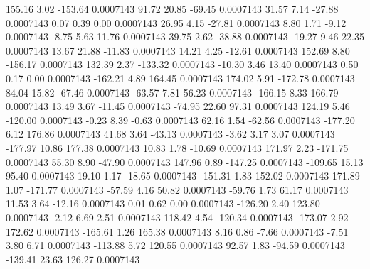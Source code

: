       155.16        3.02     -153.64     0.0007143
       91.72       20.85      -69.45     0.0007143
       31.57        7.14      -27.88     0.0007143
        0.07        0.39        0.00     0.0007143
       26.95        4.15      -27.81     0.0007143
        8.80        1.71       -9.12     0.0007143
       -8.75        5.63       11.76     0.0007143
       39.75        2.62      -38.88     0.0007143
      -19.27        9.46       22.35     0.0007143
       13.67       21.88      -11.83     0.0007143
       14.21        4.25      -12.61     0.0007143
      152.69        8.80     -156.17     0.0007143
      132.39        2.37     -133.32     0.0007143
      -10.30        3.46       13.40     0.0007143
        0.50        0.17        0.00     0.0007143
     -162.21        4.89      164.45     0.0007143
      174.02        5.91     -172.78     0.0007143
       84.04       15.82      -67.46     0.0007143
      -63.57        7.81       56.23     0.0007143
     -166.15        8.33      166.79     0.0007143
       13.49        3.67      -11.45     0.0007143
      -74.95       22.60       97.31     0.0007143
      124.19        5.46     -120.00     0.0007143
       -0.23        8.39       -0.63     0.0007143
       62.16        1.54      -62.56     0.0007143
     -177.20        6.12      176.86     0.0007143
       41.68        3.64      -43.13     0.0007143
       -3.62        3.17        3.07     0.0007143
     -177.97       10.86      177.38     0.0007143
       10.83        1.78      -10.69     0.0007143
      171.97        2.23     -171.75     0.0007143
       55.30        8.90      -47.90     0.0007143
      147.96        0.89     -147.25     0.0007143
     -109.65       15.13       95.40     0.0007143
       19.10        1.17      -18.65     0.0007143
     -151.31        1.83      152.02     0.0007143
      171.89        1.07     -171.77     0.0007143
      -57.59        4.16       50.82     0.0007143
      -59.76        1.73       61.17     0.0007143
       11.53        3.64      -12.16     0.0007143
        0.01        0.62        0.00     0.0007143
     -126.20        2.40      123.80     0.0007143
       -2.12        6.69        2.51     0.0007143
      118.42        4.54     -120.34     0.0007143
     -173.07        2.92      172.62     0.0007143
     -165.61        1.26      165.38     0.0007143
        8.16        0.86       -7.66     0.0007143
       -7.51        3.80        6.71     0.0007143
     -113.88        5.72      120.55     0.0007143
       92.57        1.83      -94.59     0.0007143
     -139.41       23.63      126.27     0.0007143
